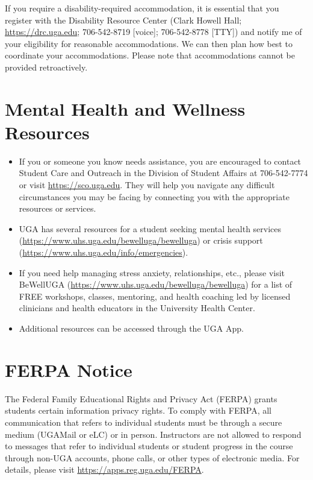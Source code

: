 \documentclass[12pt]{article}
\begin{document}
If you require a disability-required accommodation, it is essential
that you register with the Disability Resource Center (Clark Howell
Hall; \url{https://drc.uga.edu}; 706-542-8719 [voice]; 706-542-8778 [TTY])
and notify me of your eligibility for reasonable accommodations. We
can then plan how best to coordinate your accommodations. Please note
that accommodations cannot be provided retroactively.



\vspace{-2mm}
\section*{\normalsize Mental Health and Wellness Resources}
\vspace{-4mm}

\begin{itemize}
  \item If you or someone you know needs assistance, you are
    encouraged to contact Student Care and Outreach in the Division of
    Student Affairs at 706-542-7774 or visit \url{https://sco.uga.edu}. They
    will help you navigate any difficult circumstances you may be facing
    by connecting you with the appropriate resources or services.
  \item UGA has several resources for a student seeking mental health
    services (\url{https://www.uhs.uga.edu/bewelluga/bewelluga}) or crisis
    support (\url{https://www.uhs.uga.edu/info/emergencies}).
  \item If you need help managing stress anxiety, relationships, etc.,
    please visit BeWellUGA (\url{https://www.uhs.uga.edu/bewelluga/bewelluga})
    for a list of FREE workshops, classes, mentoring, and health
    coaching led by licensed clinicians and health educators in the
    University Health Center.
  \item Additional resources can be accessed through the UGA App.
\end{itemize}




\vspace{-2mm}
\section*{\normalsize FERPA Notice}
\vspace{-4mm}

The Federal Family Educational Rights and Privacy Act (FERPA) grants
students certain information privacy rights. To comply with FERPA, all
communication that refers to individual students must be through a
secure medium (UGAMail or eLC) or in person. Instructors are not
allowed to respond to messages that refer to individual students or
student progress in the course through non-UGA accounts, phone calls,
or other types of electronic media. For details, please visit
\url{https://apps.reg.uga.edu/FERPA}. 
\end{document}
